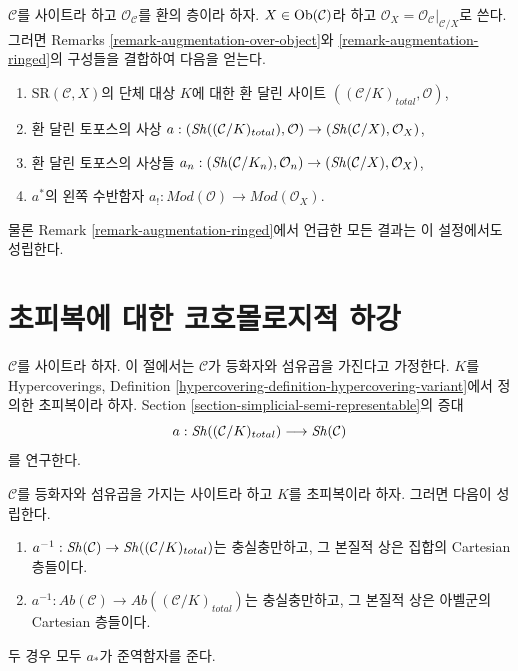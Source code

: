 \begin{remark}[대상 위에서의 환 달린 변형]
\label{remark-augmentation-ringed-over-object}
$\mathcal{C}$를 사이트라 하고 $\mathcal{O}_\mathcal{C}$를
환의 층이라 하자. $X \in \mathop{\mathrm{Ob}}\nolimits(\mathcal{C})$라 하고
$\mathcal{O}_X = \mathcal{O}_\mathcal{C}|_{\mathcal{C}/X}$로 쓴다.
그러면 Remarks \ref{remark-augmentation-over-object}와
\ref{remark-augmentation-ringed}의 구성들을 결합하여 다음을 얻는다.
\begin{enumerate}
\item $\text{SR}(\mathcal{C}, X)$의 단체 대상 $K$에 대한 환 달린 사이트
$((\mathcal{C}/K)_{total}, \mathcal{O})$,
\item 환 달린 토포스의 사상
$a : (\mathop{\mathit{Sh}}\nolimits((\mathcal{C}/K)_{total}), \mathcal{O}) \to
(\mathop{\mathit{Sh}}\nolimits(\mathcal{C}/X), \mathcal{O}_X)$,
\item 환 달린 토포스의 사상들
$a_n : (\mathop{\mathit{Sh}}\nolimits(\mathcal{C}/K_n), \mathcal{O}_n) \to
(\mathop{\mathit{Sh}}\nolimits(\mathcal{C}/X), \mathcal{O}_X)$,
\item $a^*$의 왼쪽 수반함자
$a_! : \textit{Mod}(\mathcal{O}) \to \textit{Mod}(\mathcal{O}_X)$.
\end{enumerate}
물론 Remark \ref{remark-augmentation-ringed}에서 언급한 모든 결과는
이 설정에서도 성립한다.
\end{remark}

\section{초피복에 대한 코호몰로지적 하강}
\label{section-cohomological-descent-hypercoverings}

\noindent
$\mathcal{C}$를 사이트라 하자. 이 절에서는 $\mathcal{C}$가 등화자와
섬유곱을 가진다고 가정한다. $K$를 Hypercoverings, Definition
\ref{hypercovering-definition-hypercovering-variant}에서 정의한
초피복이라 하자. Section \ref{section-simplicial-semi-representable}의 증대
$$
a : \mathop{\mathit{Sh}}\nolimits((\mathcal{C}/K)_{total}) \longrightarrow \mathop{\mathit{Sh}}\nolimits(\mathcal{C})
$$
를 연구한다.

\begin{lemma}
\label{lemma-hypercovering-descent-sheaves}
$\mathcal{C}$를 등화자와 섬유곱을 가지는 사이트라 하고 $K$를
초피복이라 하자. 그러면 다음이 성립한다.
\begin{enumerate}
\item $a^{-1} : \mathop{\mathit{Sh}}\nolimits(\mathcal{C}) \to \mathop{\mathit{Sh}}\nolimits((\mathcal{C}/K)_{total})$는
충실충만하고, 그 본질적 상은 집합의 Cartesian 층들이다.
\item $a^{-1} : \textit{Ab}(\mathcal{C}) \to
\textit{Ab}((\mathcal{C}/K)_{total})$는 충실충만하고,
그 본질적 상은 아벨군의 Cartesian 층들이다.
\end{enumerate}
두 경우 모두 $a_*$가 준역함자를 준다.
\end{lemma}

